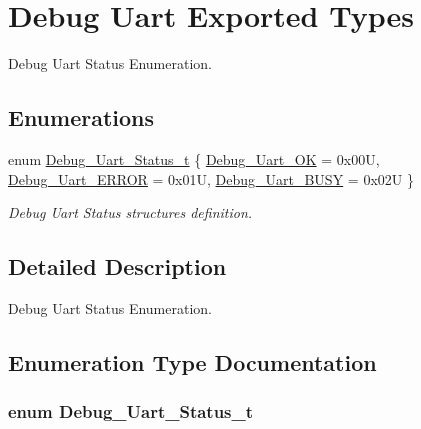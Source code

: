 \hypertarget{group___debug___uart___exported___types}{}\section{Debug Uart Exported Types}
\label{group___debug___uart___exported___types}


Debug Uart Status Enumeration.  


\subsection*{Enumerations}
\begin{DoxyCompactItemize}
\item 
enum \hyperlink{group___debug___uart___exported___types_ga334c43797179106e55aa97a2d7fe2e78}{Debug\+\_\+\+Uart\+\_\+\+Status\+\_\+t} \{ \hyperlink{group___debug___uart___exported___types_gga334c43797179106e55aa97a2d7fe2e78a1a32bb6432c88773706b326ddffc1e43}{Debug\+\_\+\+Uart\+\_\+\+OK} = 0x00U, 
\hyperlink{group___debug___uart___exported___types_gga334c43797179106e55aa97a2d7fe2e78ab7f4dcc76b19a0c456252cbbd966306f}{Debug\+\_\+\+Uart\+\_\+\+E\+R\+R\+OR} = 0x01U, 
\hyperlink{group___debug___uart___exported___types_gga334c43797179106e55aa97a2d7fe2e78aa9cf293e9c97e3d47b8ac37ae438ea1c}{Debug\+\_\+\+Uart\+\_\+\+B\+U\+SY} = 0x02U
 \}\begin{DoxyCompactList}\small\item\em Debug Uart Status structures definition. \end{DoxyCompactList}
\end{DoxyCompactItemize}


\subsection{Detailed Description}
Debug Uart Status Enumeration. 



\subsection{Enumeration Type Documentation}
\subsubsection[{\texorpdfstring{Debug\+\_\+\+Uart\+\_\+\+Status\+\_\+t}{Debug_Uart_Status_t}}]{\setlength{\rightskip}{0pt plus 5cm}enum {\bf Debug\+\_\+\+Uart\+\_\+\+Status\+\_\+t}}\hypertarget{group___debug___uart___exported___types_ga334c43797179106e55aa97a2d7fe2e78}{}\label{group___debug___uart___exported___types_ga334c43797179106e55aa97a2d7fe2e78}


